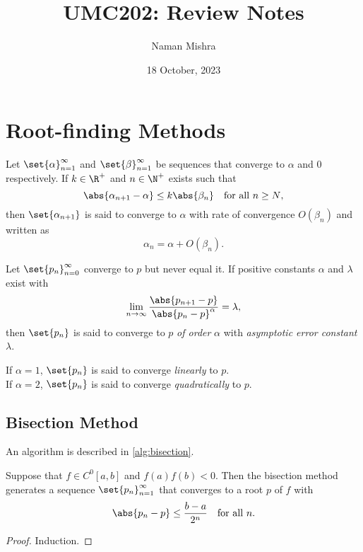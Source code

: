 \documentclass[12pt]{article}
\title{UMC202: Review Notes}
\author{Naman Mishra}
\date{18 October, 2023}
\begin{document}
\maketitle

\section{Root-finding Methods} \label{sec:root_finding}
\begin{definition} \label{def:root_finding:rate}
    Let $\set{\alpha}_{n=1}^\infty$ and $\set{\beta}_{n=1}^\infty$ be sequences
    that converge to $\alpha$ and $0$ respectively.
    If $k \in \R^+$ and $n \in \N^+$ exists such that \[
        \abs{\alpha_{n+1} - \alpha} \leq k \abs{\beta_n} \quad \text{for all $n \geq N$,}
    \] then $\set{\alpha_{n+1}}$ is said to converge to $\alpha$ with rate of
    convergence $O(\beta_n)$ and written as \[
        \alpha_n = \alpha + O(\beta_n).
    \]
\end{definition}
\begin{definition} \label{def:root_finding:order}
    Let $\set{p_n}_{n=0}^\infty$ converge to $p$ but never equal it.
    If positive constants $\alpha$ and $\lambda$ exist with \[
        \lim_{n \to \infty} \frac{\abs{p_{n+1} - p}}{\abs{p_n - p}^\alpha}
            = \lambda,
    \] then $\set{p_n}$ is said to converge to $p$ \emph{of order} $\alpha$ with
    \emph{asymptotic error constant} $\lambda$.
\end{definition}
\begin{remark}
    If $\alpha = 1$, $\set{p_n}$ is said to converge \emph{linearly} to $p$. \\
    If $\alpha = 2$, $\set{p_n}$ is said to converge \emph{quadratically} to
        $p$.
\end{remark}
\subsection{Bisection Method} \label{sec:bisection}
An algorithm is described in \cref{alg:bisection}.
\begin{theorem}[Convergence] \label{thm:bisection:convergence}
    Suppose that $f \in C^0[a, b]$ and $f(a)f(b) < 0$.
    Then the bisection method generates a sequence $\set{p_n}_{n=1}^\infty$
    that converges to a root $p$ of $f$ with \[
        \abs{p_n - p} \leq \frac{b - a}{2^n} \quad \text{for all $n$.}
    \]
\end{theorem}
\begin{proof} Induction. \end{proof}
\end{document}
